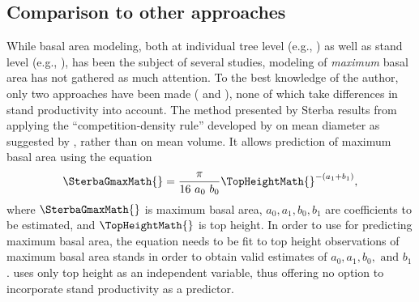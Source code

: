 \subsection{Comparison to other approaches}

While basal area modeling, both at individual tree level (e.g., \textcite{Andreassen2003,Hein2006,Jogiste2000,Monserud1996,Nystroem1997,Schroeder2002,Wimberly1996}) as well as stand level (e.g., \textcite{Castedo-Dorado2007,Chikumbo2001,Chikumbo1999,Eerikaeinen2003}), has been the subject of several studies, modeling of \emph{maximum} basal area has not gathered as much attention.  To the best knowledge of the author, only two approaches have been made (\textcite{Sterba1975,Sterba1987,Sterba1981} and \textcite{Woerdehoff2016}), none of which take differences in stand productivity into account.
The method presented by Sterba results from applying the ``competition-density rule'' developed by \textcite{Kira1953,Ando1968,Ando1968a,Tadaki1963} on mean diameter as suggested by \textcite{Goulding1972}, rather than on mean volume.  It allows prediction of maximum basal area using the equation
\begin{equation}
  \label{eq:SterbaGmax}
  \SterbaGmaxMath{} = \frac{\pi}{16~a_0~b_0} \TopHeightMath{} ^ {-(a_1 + b_1)},
\end{equation}
where \(\SterbaGmaxMath{}\) is maximum basal area, \(a_0, a_1, b_0, b_1\) are coefficients to be estimated, and \(\TopHeightMath{}\) is top height.
In order to use  for predicting maximum basal area, the equation needs to be fit to top height observations of maximum basal area stands in order to obtain valid estimates of \(a_0, a_1, b_0, \text{ and } b_1\).    uses only top height as an independent variable, thus offering no option to incorporate stand productivity as a predictor.
